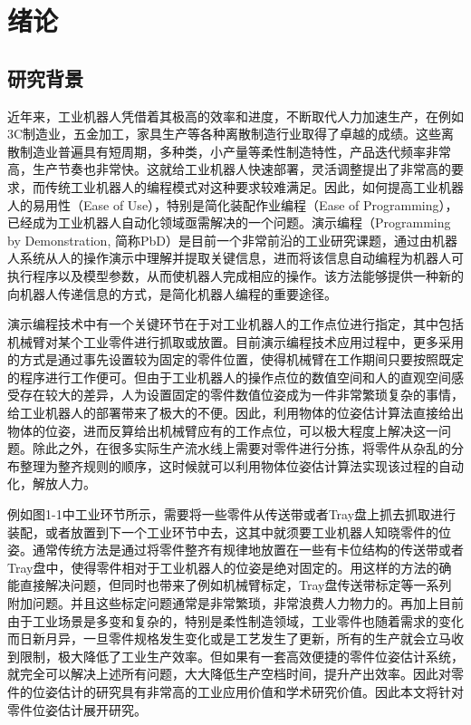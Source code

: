 \chapter{绪论}

\section{研究背景}

近年来，工业机器人凭借着其极高的效率和进度，不断取代人力加速生产，在例如3C制造业，五金加工，家具生产等各种离散制造行业取得了卓越的成绩。这些离散制造业普遍具有短周期，多种类，小产量等柔性制造特性，产品迭代频率非常高，生产节奏也非常快。这就给工业机器人快速部署，灵活调整提出了非常高的要求，而传统工业机器人的编程模式对这种要求较难满足。因此，如何提高工业机器人的易用性（Ease of Use），特别是简化装配作业编程（Ease of Programming），已经成为工业机器人自动化领域亟需解决的一个问题。演示编程（Programming by Demonstration, 简称PbD）是目前一个非常前沿的工业研究课题，通过由机器人系统从人的操作演示中理解并提取关键信息，进而将该信息自动编程为机器人可执行程序以及模型参数，从而使机器人完成相应的操作\cite{billard2008robot}。该方法能够提供一种新的向机器人传递信息的方式，是简化机器人编程的重要途径\cite{argall2009survey}。

演示编程技术中有一个关键环节在于对工业机器人的工作点位进行指定，其中包括机械臂对某个工业零件进行抓取或放置。目前演示编程技术应用过程中，更多采用的方式是通过事先设置较为固定的零件位置，使得机械臂在工作期间只要按照既定的程序进行工作便可。但由于工业机器人的操作点位的数值空间和人的直观空间感受存在较大的差异，人为设置固定的零件数值位姿成为一件非常繁琐复杂的事情，给工业机器人的部署带来了极大的不便。因此，利用物体的位姿估计算法直接给出物体的位姿，进而反算给出机械臂应有的工作点位，可以极大程度上解决这一问题。除此之外，在很多实际生产流水线上需要对零件进行分拣，将零件从杂乱的分布整理为整齐规则的顺序，这时候就可以利用物体位姿估计算法实现该过程的自动化，解放人力。

例如图1-1中工业环节所示，需要将一些零件从传送带或者Tray盘上抓去抓取进行装配，或者放置到下一个工业环节中去，这其中就须要工业机器人知晓零件的位姿。通常传统方法是通过将零件整齐有规律地放置在一些有卡位结构的传送带或者Tray盘中，使得零件相对于工业机器人的位姿是绝对固定的。用这样的方法的确能直接解决问题，但同时也带来了例如机械臂标定，Tray盘传送带标定等一系列附加问题。并且这些标定问题通常是非常繁琐，非常浪费人力物力的。再加上目前由于工业场景是多变和复杂的，特别是柔性制造领域，工业零件也随着需求的变化而日新月异，一旦零件规格发生变化或是工艺发生了更新，所有的生产就会立马收到限制，极大降低了工业生产效率。但如果有一套高效便捷的零件位姿估计系统，就完全可以解决上述所有问题，大大降低生产空档时间，提升产出效率。因此对零件的位姿估计的研究具有非常高的工业应用价值和学术研究价值。因此本文将针对零件位姿估计展开研究。


